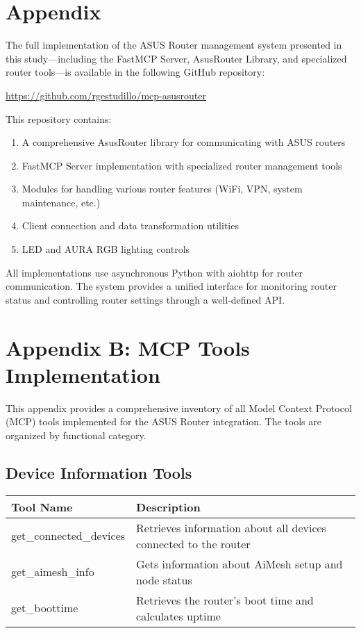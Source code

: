 \chapter*{Appendix}  
  
The full implementation of the ASUS Router management system presented in this study—including the FastMCP Server, AsusRouter Library, and specialized router tools—is available in the following GitHub repository:  
  
\url{https://github.com/rgestudillo/mcp-asusrouter}  
  
This repository contains:  
\begin{enumerate}  
    \item A comprehensive AsusRouter library for communicating with ASUS routers  
    \item FastMCP Server implementation with specialized router management tools  
    \item Modules for handling various router features (WiFi, VPN, system maintenance, etc.)  
    \item Client connection and data transformation utilities  
    \item LED and AURA RGB lighting controls  
\end{enumerate}  
  
All implementations use asynchronous Python with aiohttp for router communication. The system provides a unified interface for monitoring router status and controlling router settings through a well-defined API.

\chapter*{Appendix B: MCP Tools Implementation}
\label{app:mcp_tools}

This appendix provides a comprehensive inventory of all Model Context Protocol (MCP) tools implemented for the ASUS Router integration. The tools are organized by functional category.

\section*{Device Information Tools}
\begin{tabular}{|p{6cm}|p{9cm}|}
\hline
\textbf{Tool Name} & \textbf{Description} \\
\hline
get\_connected\_devices & Retrieves information about all devices connected to the router \\
\hline
get\_aimesh\_info & Gets information about AiMesh setup and node status \\
\hline
get\_boottime & Retrieves the router's boot time and calculates uptime \\
\hline
\end{tabular}

